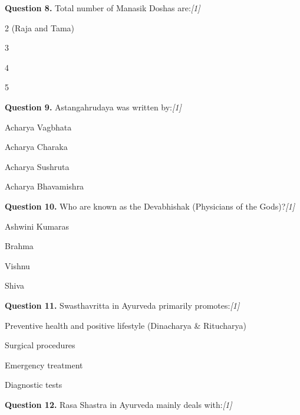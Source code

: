 \documentclass[11pt,a4paper]{article}
\newcommand{\pts}[1]{\hfill   \textit{[#1]}}
\begin{document}
\medskip




\noindent   \textbf{Question 8.} Total number of Manasik Doshas are:\pts{1}

\begin{parts}
  \item 2 (Raja and Tama)
  \item 3
  \item 4
  \item 5
\end{parts}

\medskip




\noindent   \textbf{Question 9.} Astangahrudaya was written by:\pts{1}

\begin{parts}
  \item Acharya Vagbhata
  \item Acharya Charaka
  \item Acharya Sushruta
  \item Acharya Bhavamishra
\end{parts}

\medskip




\noindent   \textbf{Question 10.} Who are known as the Devabhishak (Physicians of the Gods)?\pts{1}

\begin{parts}
  \item Ashwini Kumaras
  \item Brahma
  \item Vishnu
  \item Shiva
\end{parts}

\medskip




\noindent   \textbf{Question 11.} Swasthavritta in Ayurveda primarily promotes:\pts{1}

\begin{parts}
  \item Preventive health and positive lifestyle (Dinacharya \& Ritucharya)
  \item Surgical procedures
  \item Emergency treatment
  \item Diagnostic tests
\end{parts}

\medskip




\noindent   \textbf{Question 12.} Rasa Shastra in Ayurveda mainly deals with:\pts{1}
\end{document}
